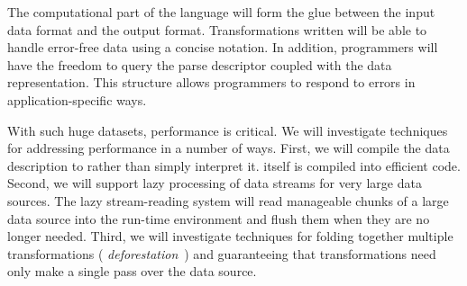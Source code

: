 \documentclass[11pt]{article}
\begin{document}
The computational part of the \datatype{} language will form the glue between
the input data format and the output format.  Transformations written
\datatype{} will be able to handle error-free data using a concise 
notation.  In addition, programmers will have the freedom to
query the parse descriptor coupled with the data representation. 
This structure allows programmers
to respond to errors in application-specific ways.

With such huge datasets, performance is critical. We will 
investigate techniques for addressing performance in a 
number of ways.  First, we will
compile the data description to \pads{} rather than simply interpret
it. \pads{} itself is compiled into efficient \C{} code.  Second, we
will support lazy processing of data streams for very large data
sources.  The lazy stream-reading system will read manageable chunks
of a large data source into the run-time environment and flush them
when they are no longer needed.  Third, we will investigate techniques
for folding together multiple transformations (\ie{} {\em deforestation}~\cite{wadler:deforestation})
and guaranteeing that transformations need only make a single pass
over the data source.


\end{document}
